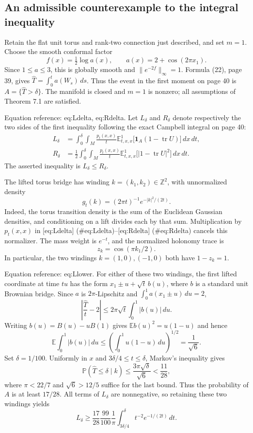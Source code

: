 \documentclass[10pt]{article}
\begin{document}
\subsection*{An admissible counterexample to the integral inequality}
Retain the flat unit torus and rank-two connection just described, and set \(m=1\). Choose the smooth conformal factor \[f(x)=\tfrac12\log a(x),\qquad a(x)=2+\cos(2\pi x_1).\] Since \(1\leq a\leq3\), this is globally smooth and \(\|e^{-2f}\|_\infty=1\). Formula (22), page 39, gives \(\widehat T=\int_0^t a(W_s)\,ds\). Thus the event in the first moment on page 40 is \(A=\{\widehat T>\delta\}\). The manifold is closed and \(m=1\) is nonzero; all assumptions of Theorem 7.1 are satisfied.\par
Equation reference: eq:Ldelta, eq:Rdelta. Let \(L_\delta\) and \(R_\delta\) denote respectively the two sides of the first inequality following the exact Campbell integral on page 40: \[\begin{aligned}
 L_\delta&=\int_0^\delta\!\int_M\frac{p_t(x,x)}t
 \mathbb E^1_{t,x,x}\bigl[\mathbf1_A(1-\operatorname{tr}U)\bigr]\,dx\,dt,
 \\
 R_\delta&=\frac12\int_0^\delta\!\int_M\frac{p_t(x,x)}t
 \mathbb E^1_{t,x,x}\bigl[|1-\operatorname{tr}U|^2\bigr]\,dx\,dt.
 \end{aligned}\] The asserted inequality is \(L_\delta\leq R_\delta\).\par
The lifted torus bridge has winding \(k=(k_1,k_2)\in\mathbb Z^2\), with unnormalized density \[g_t(k)=(2\pi t)^{-1}e^{-|k|^2/(2t)}.\] Indeed, the torus transition density is the sum of the Euclidean Gaussian densities, and conditioning on a lift divides each by that sum. Multiplication by \(p_t(x,x)\) in [eq:Ldelta] (\#eq:Ldelta)–[eq:Rdelta] (\#eq:Rdelta) cancels this normalizer. The mass weight is \(e^{-t}\), and the normalized holonomy trace is \[z_k=\cos(\pi k_1/2).\] In particular, the two windings \(k=(1,0),(-1,0)\) both have \(1-z_k=1\).\par
Equation reference: eq:Llower. For either of these two windings, the first lifted coordinate at time \(tu\) has the form \(x_1\pm u+\sqrt t\,b(u)\), where \(b\) is a standard unit Brownian bridge. Since \(a\) is \(2\pi\)-Lipschitz and \(\int_0^1 a(x_1\pm u)\,du=2\), \[\left|\frac{\widehat T}{t}-2\right|
 \leq2\pi\sqrt t\int_0^1|b(u)|\,du.\] Writing \(b(u)=B(u)-uB(1)\) gives \(\mathbb Eb(u)^2=u(1-u)\) and hence \[\mathbb E\int_0^1|b(u)|\,du
 \leq\left(\int_0^1u(1-u)\,du\right)^{1/2}
 =\frac1{\sqrt6}.\] Set \(\delta=1/100\). Uniformly in \(x\) and \(3\delta/4\leq t\leq\delta\), Markov’s inequality gives \[\mathbb P(\widehat T\leq\delta\mid k)
 \leq\frac{3\pi\sqrt\delta}{\sqrt6}
 <\frac{11}{28},\] where \(\pi<22/7\) and \(\sqrt6>12/5\) suffice for the last bound. Thus the probability of \(A\) is at least \(17/28\). All terms of \(L_\delta\) are nonnegative, so retaining these two windings yields \[
 L_\delta\geq\frac{17}{28}\frac{99}{100}\frac1\pi
 \int_{3\delta/4}^{\delta}t^{-2}e^{-1/(2t)}\,dt.\]\par
\end{document}
